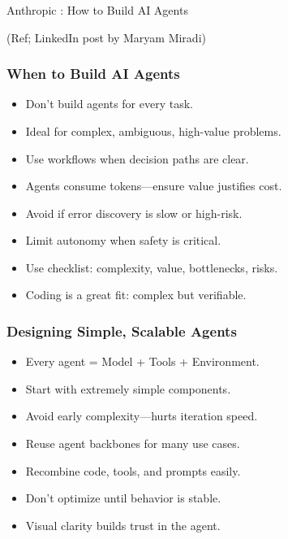 \begin{frame}[fragile]\frametitle{}
\begin{center}
{\Large Anthropic :  How to Build AI Agents}

{\tiny (Ref; LinkedIn post by Maryam Miradi)}
\end{center}
\end{frame}

\begin{frame}[fragile]\frametitle{When to Build AI Agents}
    \begin{itemize}
        \item Don’t build agents for every task.
        \item Ideal for complex, ambiguous, high-value problems.
        \item Use workflows when decision paths are clear.
        \item Agents consume tokens—ensure value justifies cost.
        \item Avoid if error discovery is slow or high-risk.
        \item Limit autonomy when safety is critical.
        \item Use checklist: complexity, value, bottlenecks, risks.
        \item Coding is a great fit: complex but verifiable.
    \end{itemize}
\end{frame}

\begin{frame}[fragile]\frametitle{Designing Simple, Scalable Agents}
    \begin{itemize}
        \item Every agent = Model + Tools + Environment.
        \item Start with extremely simple components.
        \item Avoid early complexity—hurts iteration speed.
        \item Reuse agent backbones for many use cases.
        \item Recombine code, tools, and prompts easily.
        \item Don’t optimize until behavior is stable.
        \item Visual clarity builds trust in the agent.
    \end{itemize}
\end{frame}

